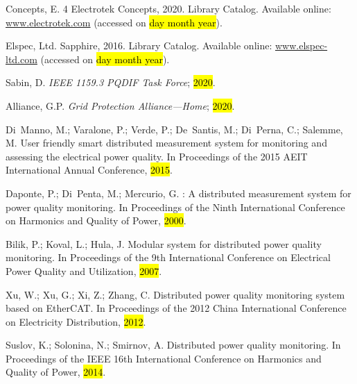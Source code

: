 \documentclass[energies,article,accept,moreauthors,pdftex]{Definitions/mdpi}
\begin{document}
\begin{thebibliography}{999}
Concepts, E.
 4 {\textbar} {Electrotek} {Concepts}, 2020.
\newblock Library Catalog. Available online:  \url{www.electrotek.com}  (accessed on \hl{day month year}).

{Elspec, Ltd}.
 {Sapphire}, 2016.
\newblock Library Catalog. Available online:  \url{www.elspec-ltd.com}  (accessed on \hl{day month year}).

Sabin, D.
\newblock \emph{{IEEE} 1159.3 {PQDIF} {Task} {Force}}; \hl{2020}.

Alliance, G.P.
\newblock \emph{Grid {Protection} {Alliance}---{Home}}; \hl{2020}.

Di~Manno, M.; Varalone, P.; Verde, P.; De~Santis, M.; Di~Perna, C.; Salemme, M.
\newblock User friendly smart distributed measurement system for monitoring and
assessing the electrical power quality.
\newblock In Proceedings of the 2015 {AEIT} {International} {Annual}
{Conference}, \hl{2015}.

Daponte, P.; Di~Penta, M.; Mercurio, G.
: A distributed measurement system for power quality
monitoring.
\newblock In {Proceedings of the } Ninth {International} {Conference} on {Harmonics} and {Quality} of
{Power}, \hl{2000}.

Bilik, P.; Koval, L.; Hula, J.
\newblock Modular system for distributed power quality monitoring.
\newblock In {Proceedings of the } 9th {International} {Conference} on {Electrical} {Power} {Quality}
and {Utilization}, \hl{2007}.

Xu, W.; Xu, G.; Xi, Z.; Zhang, C.
\newblock Distributed power quality monitoring system based on {EtherCAT}.
\newblock In {Proceedings of the }2012 {China} {International} {Conference} on {Electricity}
{Distribution}, \hl{2012}.

Suslov, K.; Solonina, N.; Smirnov, A.
\newblock Distributed power quality monitoring.
\newblock In {Proceedings of the } {IEEE} 16th {International} {Conference} on {Harmonics} and
{Quality} of {Power}, \hl{2014}.


\end{thebibliography}
\end{document}
